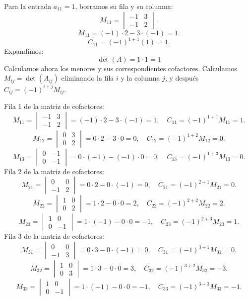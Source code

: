 Para la entrada $a_{11}=1$, borramos su fila y su columna:
\[
M_{11}=\begin{vmatrix}-1&3\\-1&2\end{vmatrix}.
\]
\[
M_{11}=(-1)\cdot 2-3\cdot (-1)=1.
\]
\[
C_{11}=(-1)^{1+1}(1)=1.
\]
Expandimos: \[
\boxed{\det(A)=1\cdot 1=1}
\]
Calculamos ahora los menores y sus correspondientes cofactores. Calculamos $M_{ij}=\det(A_{ij})$ eliminando la fila $i$ y la columna $j$, y después $C_{ij}=(-1)^{i+j}M_{ij}$.

Fila 1 de la matriz de cofactores:
\[
M_{11}=\begin{vmatrix}-1&3\\-1&2\end{vmatrix}=(-1)\cdot 2-3\cdot (-1)=1,\quad C_{11}=(-1)^{1+1}M_{11}=1.
\]
\[
M_{12}=\begin{vmatrix}0&3\\0&2\end{vmatrix}=0\cdot 2-3\cdot 0=0,\quad C_{12}=(-1)^{1+2}M_{12}=0.
\]
\[
M_{13}=\begin{vmatrix}0&-1\\0&-1\end{vmatrix}=0\cdot (-1)-(-1)\cdot 0=0,\quad C_{13}=(-1)^{1+3}M_{13}=0.
\]
Fila 2 de la matriz de cofactores:
\[
M_{21}=\begin{vmatrix}0&0\\-1&2\end{vmatrix}=0\cdot 2-0\cdot (-1)=0,\quad C_{21}=(-1)^{2+1}M_{21}=0.
\]
\[
M_{22}=\begin{vmatrix}1&0\\0&2\end{vmatrix}=1\cdot 2-0\cdot 0=2,\quad C_{22}=(-1)^{2+2}M_{22}=2.
\]
\[
M_{23}=\begin{vmatrix}1&0\\0&-1\end{vmatrix}=1\cdot (-1)-0\cdot 0=-1,\quad C_{23}=(-1)^{2+3}M_{23}=1.
\]
Fila 3 de la matriz de cofactores:
\[
M_{31}=\begin{vmatrix}0&0\\-1&3\end{vmatrix}=0\cdot 3-0\cdot (-1)=0,\quad C_{31}=(-1)^{3+1}M_{31}=0.
\]
\[
M_{32}=\begin{vmatrix}1&0\\0&3\end{vmatrix}=1\cdot 3-0\cdot 0=3,\quad C_{32}=(-1)^{3+2}M_{32}=-3.
\]
\[
M_{33}=\begin{vmatrix}1&0\\0&-1\end{vmatrix}=1\cdot (-1)-0\cdot 0=-1,\quad C_{33}=(-1)^{3+3}M_{33}=-1.
\]
